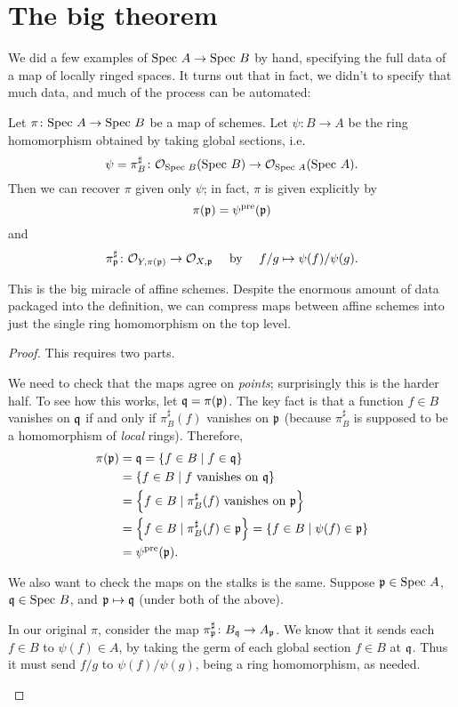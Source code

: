 \section{The big theorem}
We did a few examples of $\text{Spec } A \to \text{Spec } B$ by hand,
specifying the full data of a map of locally ringed spaces.
It turns out that in fact, we didn't to specify that much data,
and much of the process can be automated:
\begin{proposition}
	\label{prop:affine_reconstruction}
	Let $\pi \colon \text{Spec } A \to \text{Spec } B$ be a map of schemes.
	Let $\psi \colon B \to A$ be the ring homomorphism
	obtained by taking global sections, i.e.
	\[ \psi= \pi^\sharp_B \colon \mathcal O_{\text{Spec } B}(\text{Spec } B)
		\to \mathcal O_{\text{Spec } A}(\text{Spec } A). \]
	Then we can recover $\pi$ given only $\psi$;
	in fact, $\pi$ is given explicitly by
	\[ \pi(\mathfrak p) = \psi^{\text{pre}}(\mathfrak p) \]
	and
	\[ \pi^\sharp_\mathfrak p \colon \mathcal O_{Y,\pi(\mathfrak p)} \to \mathcal O_{X,\mathfrak p}
			\quad\text{ by }\quad f/g \mapsto \psi(f)/\psi(g).  \]
\end{proposition}
This is the big miracle of affine schemes.
Despite the enormous amount of data packaged into the definition,
we can compress maps between affine schemes
into just the single ring homomorphism on the top level.
\begin{proof}
	This requires two parts.
	\begin{itemize}
		\ii We need to check that the maps agree on \emph{points};
		surprisingly this is the harder half.
		To see how this works, let $\mathfrak q = \pi(\mathfrak p)$.
		The key fact is that a function $f \in B$ vanishes on $\mathfrak q$
		if and only if $\pi^\sharp_B(f)$ vanishes on $\mathfrak p$
		(because $\pi^\sharp_B$ is supposed to be a
		homomorphism of \emph{local} rings).
		Therefore,
		\begin{align*}
			\pi(\mathfrak p) &= \mathfrak q = \left\{ f \in B \mid f \in \mathfrak q \right\} \\
			&= \left\{ f \in B \mid f \text{ vanishes on } \mathfrak q \right\} \\
			&= \left\{ f \in B \mid \pi^\sharp_B(f) \text{ vanishes on } \mathfrak p \right\} \\
			&= \left\{ f \in B \mid \pi^\sharp_B(f) \in \mathfrak p \right\} 
			= \left\{ f \in B \mid \psi(f) \in \mathfrak p \right\} \\
			&= \psi^{\text{pre}}(\mathfrak p).
		\end{align*}

		\ii We also want to check the maps on the stalks is the same.
		Suppose $\mathfrak p \in \text{Spec } A$, $\mathfrak q \in \text{Spec } B$,
		and $\mathfrak p \mapsto \mathfrak q$ (under both of the above).

		In our original $\pi$, consider the map
		$\pi^\sharp_\mathfrak p \colon B_\mathfrak q \to A_\mathfrak p$.
		We know that it sends each $f \in B$ to $\psi(f) \in A$,
		by taking the germ of each global section $f \in B$ at $\mathfrak q$.
		Thus it must send $f/g$ to $\psi(f) / \psi(g)$,
		being a ring homomorphism, as needed. \qedhere
	\end{itemize}
\end{proof}


